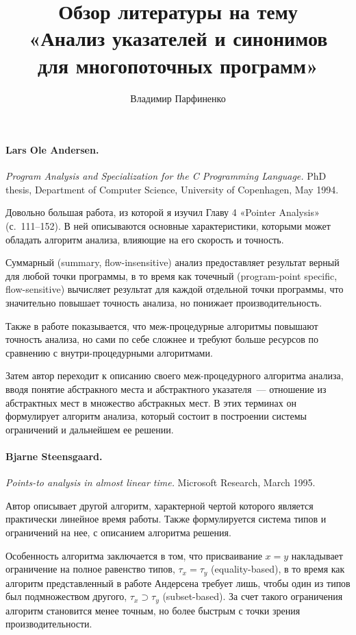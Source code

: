 \documentclass[12pt]{article}
\title{
  Обзор литературы на тему \\
  «Анализ указателей и синонимов\\ для многопоточных программ»
}
\author{
  Владимир Парфиненко
}
\newcommand{\eng}[1]{{\English#1}}
\begin{document}
  \maketitle

    \paragraph{Lars Ole Andersen.}
      \eng{
        \textit{Program Analysis and Specialization for
          the C Programming Language.}
        PhD thesis, Department of Computer Science, University of Copenhagen,
        May 1994.
      }

      Довольно большая работа, из которой я изучил Главу 4 «Pointer Analysis»
      (с.~111--152). В ней описываются основные характеристики, которыми
      может обладать алгоритм анализа, влияющие на его скорость и точность.

      Суммарный (\eng{summary, flow-insensitive}) анализ предоставляет
      результат верный для любой точки программы, в то время как точечный
      (\eng{prog\-ram-point specific, flow-sensitive}) вычисляет результат
      для каждой отдельной точки программы, что значительно повышает точность
      анализа, но понижает производительность.

      Также в работе показывается, что меж-процедурные алгоритмы повышают
      точность анализа, но сами по себе сложнее и требуют больше ресурсов по
      сравнению с внутри-процедурными алгоритмами.

      Затем автор переходит к описанию своего меж-процедурного
      алгоритма анализа, вводя понятие абстракного места и
      абстрактного указателя~--- отношение из абстрактных мест в множество
      абстракных мест. В этих терминах он формулирует алгоритм анализа, который
      состоит в построении системы ограничений и дальнейшем ее решении.


    \paragraph{Bjarne Steensgaard.}
      \eng{
        \textit{Points-to analysis in almost linear time.}
        Microsoft Research,
        March 1995.
      }

      Автор описывает другой алгоритм, характерной чертой которого является
      практически линейное время работы. Также формулируется система типов
      и ограничений на нее, с описанием алгоритма решения.

      Особенность алгоритма заключается в том, что присваивание $x = y$
      накладывает ограничение на полное равенство типов,
      $\tau_x = \tau_y$ (\eng{equality-based}),
      в то время как алгоритм представленный в работе Андерсена требует лишь,
      чтобы один из типов был подмножеством другого,
      $\tau_x \supset \tau_y$ (\eng{subset-based}).
      За счет такого ограничения алгоритм становится менее точным, но более
      быстрым с точки зрения производительности.
\end{document}
